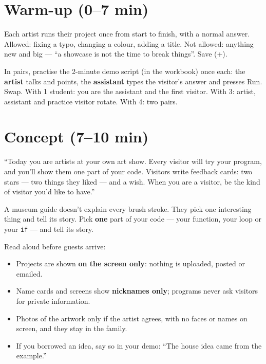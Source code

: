\section{Warm-up (0--7 min)}
\begin{freebuild}
Each artist runs their project once from start to finish, with a normal answer. Allowed: fixing a typo, changing a colour, adding a title. Not allowed: anything new and big --- \enquote{a showcase is not the time to break things}. Save (+).
\end{freebuild}
\begin{pairroles}
In pairs, practise the 2-minute demo script (in the workbook) once each: the \textbf{artist} talks and points, the \textbf{assistant} types the visitor's answer and presses Run. Swap. With 1 student: you are the assistant and the first visitor. With 3: artist, assistant and practice visitor rotate. With 4: two pairs.
\end{pairroles}

\section{Concept (7--10 min)}
\begin{teacherscript}
\enquote{Today you are artists at your own art show. Every visitor will try your program, and you'll show them one part of your code. Visitors write feedback cards: two stars --- two things they liked --- and a wish. When you are a visitor, be the kind of visitor you'd like to have.}
\end{teacherscript}
\begin{analogy}
A museum guide doesn't explain every brush stroke. They pick one interesting thing and tell its story. Pick \textbf{one} part of your code --- your function, your loop or your \texttt{if} --- and tell its story.
\end{analogy}
\begin{safety}
Read aloud before guests arrive:
\begin{itemize}[leftmargin=1.2em,itemsep=1pt]
  \item Projects are shown \textbf{on the screen only}: nothing is uploaded, posted or emailed.
  \item Name cards and screens show \textbf{nicknames only}; programs never ask visitors for private information.
  \item Photos of the artwork only if the artist agrees, with no faces or names on screen, and they stay in the family.
  \item If you borrowed an idea, say so in your demo: \enquote{The house idea came from the example.}
\end{itemize}
\end{safety}

